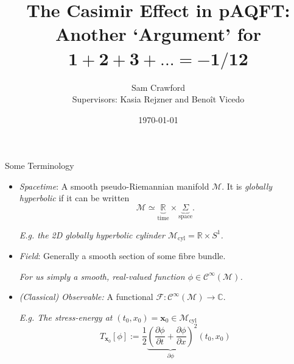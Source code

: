 \documentclass[pdf, fleqn, compress, handout]{beamer}
\title[Graduate Research Symposium 2020]{The Casimir Effect in pAQFT: \\
\large Another `Argument' for $\boldsymbol{1 + 2 + 3 + ... = - 1/12}$}
\author[Sam Crawford]{Sam Crawford\\
Supervisors: Kasia Rejzner and Beno\^it Vicedo}
\date{\today}
\newcommand{\mathsterm}[1]{{\itshape\color{dark-teal!80}#1}}
\newcommand{\ourex}[1]{{\itshape\color{viridian!70!black}#1}}
\begin{document}
\begin{nonavigation}

\begin{frame}
    \titlepage
\end{frame}

\end{nonavigation}


\begin{frame}{Some Terminology}
	\begin{itemize}
		\item	\mathsterm{Spacetime}: A smooth pseudo-Riemannian manifold
				$\mathcal{M}$.
				It is \mathsterm{globally hyperbolic} if it can be written
				\begin{equation}
					\mathcal{M}
						\simeq
					\underbrace{\mathbb{R}}_{\text{time}}
						\times
					\underbrace{\Sigma}_{\text{space}}.
				\end{equation}
		\vspace{-0.5em}
		\pause

				\ourex{
				E.g. the 2D globally hyperbolic cylinder
				$\mathcal{M}_\mathrm{cyl} = \mathbb{R} \times S^1$.
				}
		\pause
		\item	\mathsterm{Field}: Generally a smooth section of some fibre bundle.
		
		\pause
				\ourex{For us simply a smooth, real-valued function
				$\phi \in \mathcal{C}^\infty(\mathcal{M})$.}
		\pause
		\item	\mathsterm{(Classical) Observable:} A functional
				$\mathcal{F}: \mathcal{C}^\infty(\mathcal{M}) \to \mathbb{C}$. 

				\ourex{E.g. The stress-energy at
						$(t_0, x_0) = \mathbf{x}_0 \in \mathcal{M}_\mathrm{cyl}$}
				\ourex{
					\begin{equation}
						T_{\mathbf{x}_0}[\phi]
							:=
						\frac{1}{2}
						{\underbrace{
						\left(
							\frac{\partial \phi}{\partial t} +
							\frac{\partial \phi}{\partial x}
						\right)
						}_{\partial \phi}}^2
						(t_0, x_0)					
					\end{equation}
				}
	\end{itemize}
\end{frame}
\end{document}
